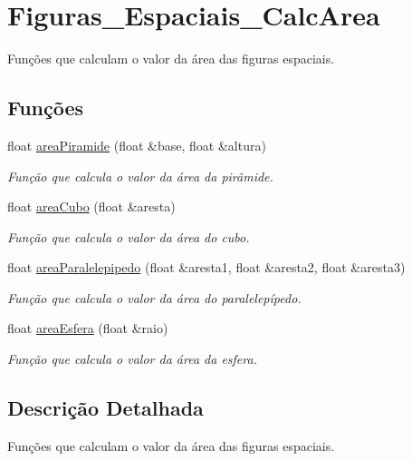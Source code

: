 \hypertarget{group__Figuras__Espaciais__CalcArea}{}\section{Figuras\+\_\+\+Espaciais\+\_\+\+Calc\+Area}
\label{group__Figuras__Espaciais__CalcArea}


Funções que calculam o valor da área das figuras espaciais.  


\subsection*{Funções}
\begin{DoxyCompactItemize}
\item 
float \hyperlink{group__Figuras__Espaciais__CalcArea_ga10226ad45447d70353626a01897d1b06}{area\+Piramide} (float \&base, float \&altura)
\begin{DoxyCompactList}\small\item\em Função que calcula o valor da área da pirâmide. \end{DoxyCompactList}\item 
float \hyperlink{group__Figuras__Espaciais__CalcArea_gab519a0d997044a93085abaaaf6270ab5}{area\+Cubo} (float \&aresta)
\begin{DoxyCompactList}\small\item\em Função que calcula o valor da área do cubo. \end{DoxyCompactList}\item 
float \hyperlink{group__Figuras__Espaciais__CalcArea_gaff7dfecfa742b07c8e8e243325d95117}{area\+Paralelepipedo} (float \&aresta1, float \&aresta2, float \&aresta3)
\begin{DoxyCompactList}\small\item\em Função que calcula o valor da área do paralelepípedo. \end{DoxyCompactList}\item 
float \hyperlink{group__Figuras__Espaciais__CalcArea_ga2d0b18f7e5391dd6a8bff93bb679171a}{area\+Esfera} (float \&raio)
\begin{DoxyCompactList}\small\item\em Função que calcula o valor da área da esfera. \end{DoxyCompactList}\end{DoxyCompactItemize}


\subsection{Descrição Detalhada}
Funções que calculam o valor da área das figuras espaciais. 



